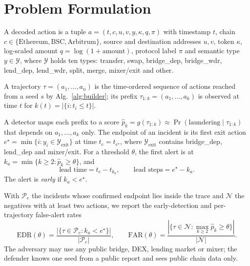 \documentclass[runningheads]{llncs}
\newcommand{\1}{\mathbb{1}}
\begin{document}
\section{Problem Formulation}
\label{sec:problem}

A decoded action is a tuple $a=(t,c,u,v,y,\kappa,q,\pi)$ with timestamp $t$, chain $c\in\{\text{Ethereum},\text{BSC},\text{Arbitrum}\}$, source and destination addresses $u,v$, token $\kappa$, log-scaled amount $q=\log(1+\text{amount})$, protocol label $\pi$ and semantic type $y\in\mathcal{Y}$, where $\mathcal{Y}$ holds ten types: \textsf{transfer}, \textsf{swap}, \textsf{bridge\_dep}, \textsf{bridge\_wdr}, \textsf{lend\_dep}, \textsf{lend\_wdr}, \textsf{split}, \textsf{merge}, \textsf{mixer/exit} and \textsf{other}.

\begin{definition}
A trajectory $\tau=(a_1,\dots,a_n)$ is the time-ordered sequence of actions reached from a seed $s$ by Alg.~\ref{alg:builder}; its prefix $\tau_{1:k}=(a_1,\dots,a_k)$ is observed at time $t$ for $k(t)=|\{i: t_i\le t\}|$.
\end{definition}

\begin{definition}
A detector maps each prefix to a score $\hat p_k=g(\tau_{1:k})\approx\Pr(\text{laundering}\mid\tau_{1:k})$ that depends on $a_1,\dots,a_k$ only.
The endpoint of an incident is its first exit action $e^\star=\min\{i: y_i\in\mathcal{Y}_{\mathrm{exit}}\}$ at time $t_e=t_{e^\star}$, where $\mathcal{Y}_{\mathrm{exit}}$ contains \textsf{bridge\_dep}, \textsf{lend\_dep} and \textsf{mixer/exit}.
For a threshold $\theta$, the first alert is at $k_a=\min\{k\ge2:\hat p_k\ge\theta\}$, and
\begin{equation}
\text{lead time}=t_e-t_{k_a},\qquad \text{lead steps}=e^\star-k_a .
\label{eq:lead}
\end{equation}
The alert is \emph{early} if $k_a<e^\star$.
\end{definition}

With $\mathcal{P}_e$ the incidents whose confirmed endpoint lies inside the trace and $\mathcal{N}$ the negatives with at least two actions, we report the early-detection and per-trajectory false-alert rates
\begin{equation}
\mathrm{EDR}(\theta)=\frac{|\{\tau\in\mathcal{P}_e: k_a<e^\star\}|}{|\mathcal{P}_e|},\qquad
\mathrm{FAR}(\theta)=\frac{|\{\tau\in\mathcal{N}: \max_{k\ge2}\hat p_k\ge\theta\}|}{|\mathcal{N}|}.
\label{eq:rates}
\end{equation}
The adversary may use any public bridge, DEX, lending market or mixer; the defender knows one seed from a public report and sees public chain data only.
\end{document}
